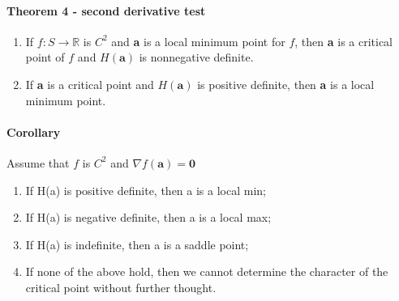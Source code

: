 \documentclass[11pt]{article}
\newcommand{\tb}[1]{\textbf{#1}}
\newcommand{\real}[0]{\mathbb{R}}
\begin{document}
\paragraph{Theorem 4 - second derivative test}
\begin{enumerate}
    \item If $f: S \rightarrow \real$ is $C^2$ and \tb{a} is a local minimum point for $f$, then \tb{a} is a critical point of $f$ and $H(\tb{a})$ is nonnegative definite.
    \item If \tb{a} is a critical point and $H(\tb{a})$ is positive definite, then \tb{a} is a local minimum point.
\end{enumerate}
\paragraph{Corollary} Assume that $f$ is $C^2$ and $\nabla f(\tb{a}) = \tb{0}$
\begin{enumerate}
    \item If H(a) is positive definite, then a is a local min;
    \item If H(a) is negative definite, then a is a local max;
    \item If H(a) is indefinite, then a is a saddle point;
    \item If none of the above hold, then we cannot determine the character of the critical point without further thought.
\end{enumerate} 
\end{document}
